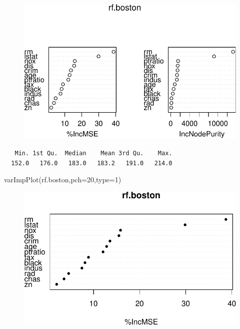 \documentclass[
  letterpaper,
  DIV=11,
  numbers=noendperiod]{scrartcl}
\newenvironment{Shaded}{\begin{snugshade}}{\end{snugshade}}
\newcommand{\AttributeTok}[1]{\textcolor[rgb]{0.40,0.45,0.13}{#1}}
\newcommand{\CommentTok}[1]{\textcolor[rgb]{0.37,0.37,0.37}{#1}}
\newcommand{\DecValTok}[1]{\textcolor[rgb]{0.68,0.00,0.00}{#1}}
\newcommand{\FunctionTok}[1]{\textcolor[rgb]{0.28,0.35,0.67}{#1}}
\newcommand{\NormalTok}[1]{\textcolor[rgb]{0.00,0.23,0.31}{#1}}
\newcommand{\SpecialCharTok}[1]{\textcolor[rgb]{0.37,0.37,0.37}{#1}}
\begin{document}
\begin{figure}[H]

{\centering \includegraphics{L13_files/figure-pdf/unnamed-chunk-22-1.pdf}

}

\end{figure}

\begin{Shaded}
\end{Shaded}

\begin{verbatim}
   Min. 1st Qu.  Median    Mean 3rd Qu.    Max. 
  152.0   176.0   183.0   183.2   191.0   214.0 
\end{verbatim}

\begin{Shaded}
\begin{Highlighting}[]
\FunctionTok{varImpPlot}\NormalTok{(rf.boston,}\AttributeTok{pch=}\DecValTok{20}\NormalTok{,}\AttributeTok{type=}\DecValTok{1}\NormalTok{)}
\end{Highlighting}
\end{Shaded}

\begin{figure}[H]

{\centering \includegraphics{L13_files/figure-pdf/unnamed-chunk-22-2.pdf}

}

\end{figure}
\end{document}
